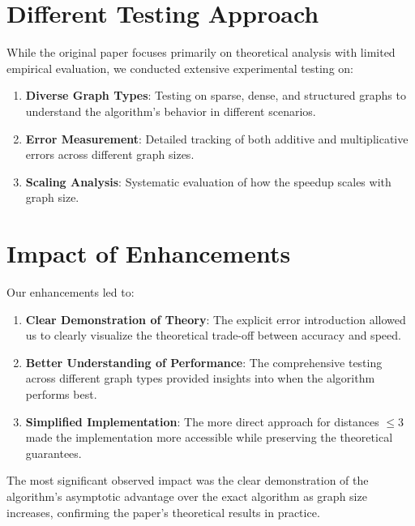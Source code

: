\documentclass[a4paper,11pt,oneside]{book}
\begin{document}
\section*{Different Testing Approach}

While the original paper focuses primarily on theoretical analysis with limited empirical evaluation, we conducted extensive experimental testing on:

\begin{enumerate}
    \item \textbf{Diverse Graph Types}: Testing on sparse, dense, and structured graphs to understand the algorithm's behavior in different scenarios.

    \item \textbf{Error Measurement}: Detailed tracking of both additive and multiplicative errors across different graph sizes.

    \item \textbf{Scaling Analysis}: Systematic evaluation of how the speedup scales with graph size.
\end{enumerate}

\section*{Impact of Enhancements}

Our enhancements led to:

\begin{enumerate}
    \item \textbf{Clear Demonstration of Theory}: The explicit error introduction allowed us to clearly visualize the theoretical trade-off between accuracy and speed.

    \item \textbf{Better Understanding of Performance}: The comprehensive testing across different graph types provided insights into when the algorithm performs best.

    \item \textbf{Simplified Implementation}: The more direct approach for distances $\leq 3$ made the implementation more accessible while preserving the theoretical guarantees.
\end{enumerate}

The most significant observed impact was the clear demonstration of the algorithm's asymptotic advantage over the exact algorithm as graph size increases, confirming the paper's theoretical results in practice.
\end{document}
